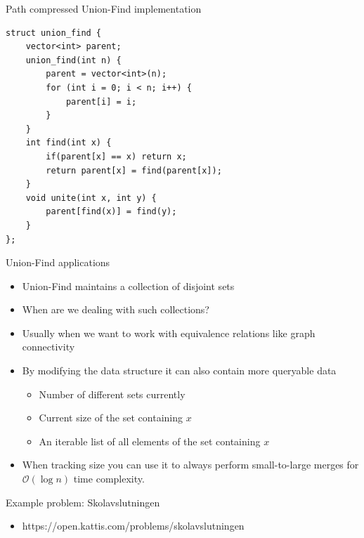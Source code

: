 \documentclass{beamer}
\begin{document}
\begin{frame}{Path compressed Union-Find implementation}
    \begin{verbatim}
struct union_find {
    vector<int> parent;
    union_find(int n) {
        parent = vector<int>(n);
        for (int i = 0; i < n; i++) {
            parent[i] = i;
        }
    }
    int find(int x) {
        if(parent[x] == x) return x;
        return parent[x] = find(parent[x]);
    }
    void unite(int x, int y) {
        parent[find(x)] = find(y);
    }
};
    \end{verbatim}
\end{frame}

\begin{frame}[plain]{Union-Find applications}
    \vspace{30pt}
    \begin{itemize}
        \item<1-> Union-Find maintains a collection of disjoint sets
        \item<2-> When are we dealing with such collections?
        \item<3-> Usually when we want to work with equivalence relations like graph connectivity
        \item<4-> By modifying the data structure it can also contain more queryable data
        \begin{itemize}
            \item<5-> Number of different sets currently
            \item<6-> Current size of the set containing $x$
            \item<7-> An iterable list of all elements of the set containing $x$
        \end{itemize}
        \item<8-> When tracking size you can use it to always perform small-to-large merges for $\mathcal{O}(\log n)$ time complexity.
    \end{itemize}
\end{frame}

\begin{frame}[plain]{Example problem: Skolavslutningen}
    \begin{itemize}
        \item https://open.kattis.com/problems/skolavslutningen
    \end{itemize}
\end{frame}
\end{document}
